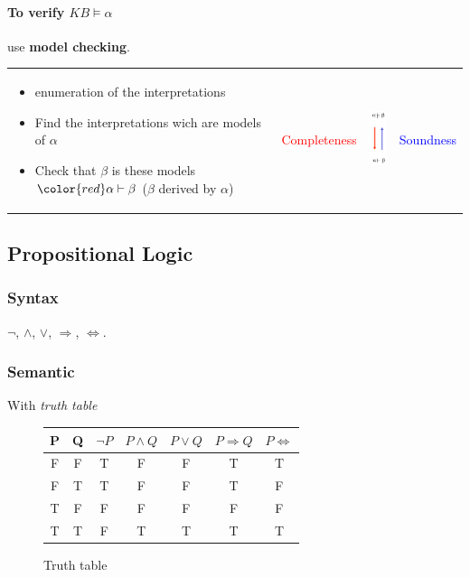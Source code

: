 \paragraph{To verify $KB \models \alpha$} use \textbf{model checking}.\\
\begin{tabular}{m{11cm}m{1cm}m{1.5cm}m{1cm}}
    \begin{itemize}
        \item enumeration of the interpretations
        \item Find the interpretations wich are models of $\alpha$
        \item Check that $\beta$ is these models $\color{red} \alpha \vdash \beta$ ($\beta$ derived by 
        $\alpha$)
    \end{itemize}
    &
    \textcolor{red}{Completeness}
    &
    \includegraphics[width=1cm]{soundness.png}
    &
    \textcolor{blue}{Soundness}
    \\
\end{tabular}


\subsection{Propositional Logic}

\subsubsection{Syntax}
$\neg$,
$\wedge$,
$\vee$, 
$\Rightarrow$, 
$\Leftrightarrow$.

\subsubsection{Semantic}
With \textit{truth table}

\begin{figure}[h]
    \centering
    \begin{tabular}{|c|c||c|c|c|c|c|}
        \hline
        P & Q & $\neg P$ & $P \wedge Q$ & $P \vee Q$ & $P \Rightarrow Q$ & $P \Leftrightarrow$ \\
        \hline
        F & F & T & F & F & T & T \\
        F & T & T & F & F & T & F \\
        T & F & F & F & F & F & F \\
        T & T & F & T & T & T & T \\
        \hline
    \end{tabular}
    \caption{Truth table}
\end{figure}


